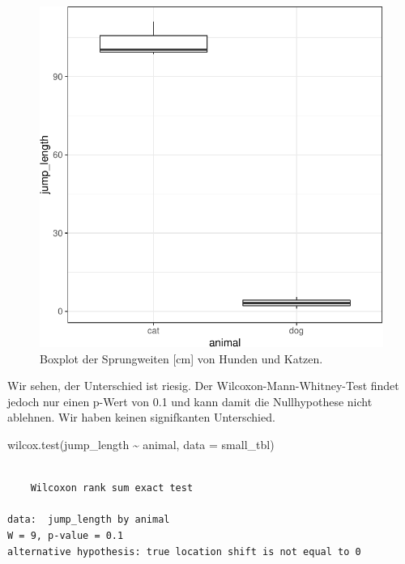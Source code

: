\documentclass[
  letterpaper,
]{scrbook}
\newenvironment{Shaded}{\begin{snugshade}}{\end{snugshade}}
\newcommand{\AttributeTok}[1]{\textcolor[rgb]{0.40,0.45,0.13}{#1}}
\newcommand{\FunctionTok}[1]{\textcolor[rgb]{0.28,0.35,0.67}{#1}}
\newcommand{\NormalTok}[1]{\textcolor[rgb]{0.00,0.23,0.31}{#1}}
\newcommand{\SpecialCharTok}[1]{\textcolor[rgb]{0.37,0.37,0.37}{#1}}
\begin{document}
\begin{figure}

{\centering \includegraphics{./stat-tests-utest_files/figure-pdf/fig-boxplot-utest-min-1.pdf}

}

\caption{\label{fig-boxplot-utest-min}Boxplot der Sprungweiten {[}cm{]}
von Hunden und Katzen.}

\end{figure}

Wir sehen, der Unterschied ist riesig. Der Wilcoxon-Mann-Whitney-Test
findet jedoch nur einen p-Wert von 0.1 und kann damit die Nullhypothese
nicht ablehnen. Wir haben keinen signifkanten Unterschied.

\begin{Shaded}
\begin{Highlighting}[]
\FunctionTok{wilcox.test}\NormalTok{(jump\_length }\SpecialCharTok{\textasciitilde{}}\NormalTok{ animal, }\AttributeTok{data =}\NormalTok{ small\_tbl)}
\end{Highlighting}
\end{Shaded}

\begin{verbatim}

    Wilcoxon rank sum exact test

data:  jump_length by animal
W = 9, p-value = 0.1
alternative hypothesis: true location shift is not equal to 0
\end{verbatim}
\end{document}
